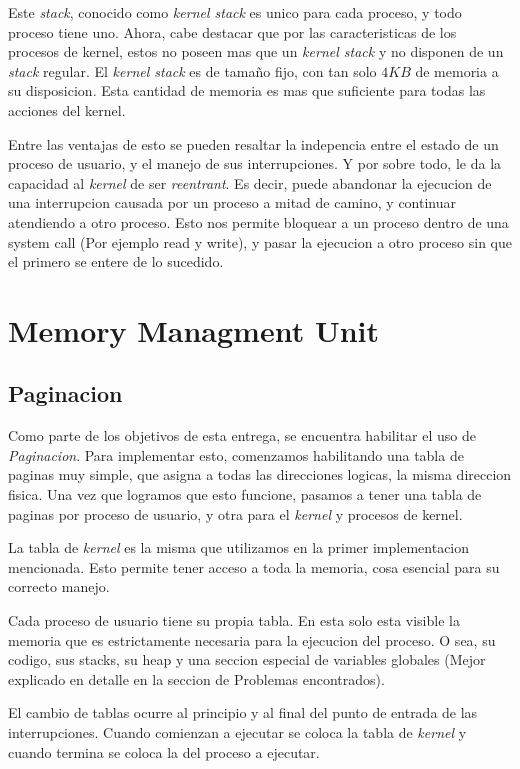 \documentclass[a4paper,10pt]{article}
\begin{document}
Este \textit{stack}, conocido como \textit{kernel stack} es unico para cada proceso, y todo proceso tiene uno.
Ahora, cabe destacar que por las caracteristicas de los procesos de kernel, estos no poseen mas que un \textit{kernel stack} y no disponen de un \textit{stack} regular.
El \textit{kernel stack} es de tamaño fijo, con tan solo $ 4KB $ de memoria a su disposicion.
Esta cantidad de memoria es mas que suficiente para todas las acciones del kernel.

Entre las ventajas de esto se pueden resaltar la indepencia entre el estado de un proceso de usuario, y el manejo de sus interrupciones.
Y por sobre todo, le da la capacidad al \textit{kernel} de ser \textit{reentrant}.
Es decir, puede abandonar la ejecucion de una interrupcion causada por un proceso a mitad de camino, y continuar atendiendo a otro proceso.
Esto nos permite bloquear a un proceso dentro de una system call (Por ejemplo read y write), y pasar la ejecucion a otro proceso sin que el primero se entere de lo sucedido.

\newpage

\section{Memory Managment Unit}

\subsection{Paginacion}
Como parte de los objetivos de esta entrega, se encuentra habilitar el uso de \textit{Paginacion}.
Para implementar esto, comenzamos habilitando una tabla de paginas muy simple, que asigna a todas las direcciones logicas, la misma direccion fisica.
Una vez que logramos que esto funcione, pasamos a tener una tabla de paginas por proceso de usuario, y otra para el \textit{kernel} y procesos de kernel.

La tabla de \textit{kernel} es la misma que utilizamos en la primer implementacion mencionada.
Esto permite tener acceso a toda la memoria, cosa esencial para su correcto manejo.

Cada proceso de usuario tiene su propia tabla.
En esta solo esta visible la memoria que es estrictamente necesaria para la ejecucion del proceso.
O sea, su codigo, sus stacks, su heap y una seccion especial de variables globales (Mejor explicado en detalle en la seccion de Problemas encontrados).

El cambio de tablas ocurre al principio y al final del punto de entrada de las interrupciones.
Cuando comienzan a ejecutar se coloca la tabla de \textit{kernel} y cuando termina se coloca la del proceso a ejecutar.
\end{document}

